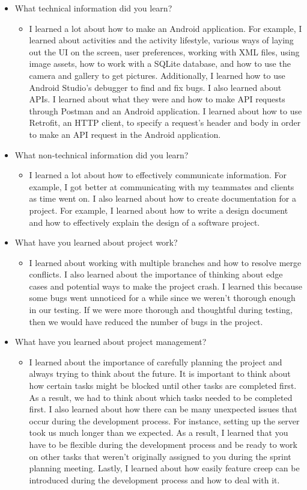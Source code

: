 \documentclass[onecolumn, draftclsnofoot,10pt, compsoc]{IEEEtran}
\begin{document}
 \begin{itemize}
     \item What technical information did you learn?
     \begin{itemize}
         \item I learned a lot about how to make an Android application. For example, I learned about activities and the activity lifestyle, various ways of laying out the UI on the screen, user preferences, working with XML files, using image assets, how to work with a SQLite database, and how to use the camera and gallery to get pictures. Additionally, I learned how to use Android Studio's debugger to find and fix bugs. I also learned about APIs. I learned about what they were and how to make API requests through Postman and an Android application. I learned about how to use Retrofit, an HTTP client, to specify a request's header and body in order to make an API request in the Android application.
     \end{itemize}
     \item What non-technical information did you learn?
     \begin{itemize}
         \item I learned a lot about how to effectively communicate information. For example, I got better at communicating with my teammates and clients as time went on. I also learned about how to create documentation for a project. For example, I learned about how to write a design document and how to effectively explain the design of a software project. 
     \end{itemize}
     \item What have you learned about project work?
     \begin{itemize}
         \item I learned about working with multiple branches and how to resolve merge conflicts. I also learned about the importance of thinking about edge cases and potential ways to make the project crash. I learned this because some bugs went unnoticed for a while since we weren't thorough enough in our testing. If we were more thorough and thoughtful during testing, then we would have reduced the number of bugs in the project.
     \end{itemize}
     \item What have you learned about project management?
     \begin{itemize}
         \item I learned about the importance of carefully planning the project and always trying to think about the future. It is important to think about how certain tasks might be blocked until other tasks are completed first. As a result, we had to think about which tasks needed to be completed first. I also learned about how there can be many unexpected issues that occur during the development process. For instance, setting up the server took us much longer than we expected. As a result, I learned that you have to be flexible during the development process and be ready to work on other tasks that weren't originally assigned to you during the sprint planning meeting. Lastly, I learned about how easily feature creep can be introduced during the development process and how to deal with it.

\end{itemize}
\end{itemize}
\end{document}
